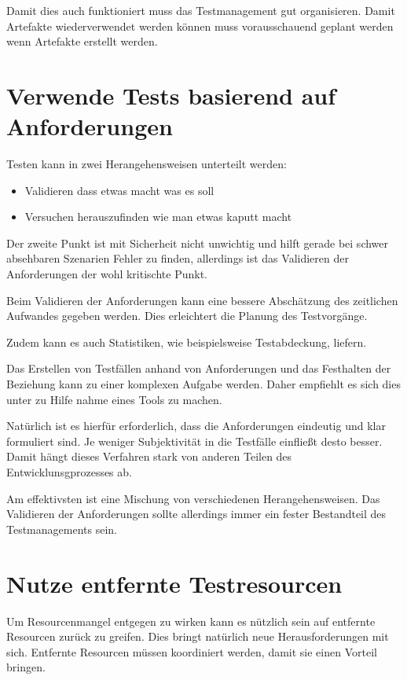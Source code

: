 Damit dies auch funktioniert muss das Testmanagement gut organisieren. Damit Artefakte wiederverwendet werden k\"onnen muss vorausschauend geplant werden wenn Artefakte erstellt werden.

\section{Verwende Tests basierend auf Anforderungen}
Testen kann in zwei Herangehensweisen unterteilt werden:
\begin{itemize}
	\item Validieren dass etwas macht was es soll
	\item Versuchen herauszufinden wie man etwas kaputt macht
\end{itemize}

Der zweite Punkt ist mit Sicherheit nicht unwichtig und hilft gerade bei schwer absehbaren Szenarien Fehler zu finden, allerdings ist das Validieren der Anforderungen der wohl kritischte Punkt.

Beim Validieren der Anforderungen kann eine bessere Absch\"atzung des zeitlichen Aufwandes gegeben werden. Dies erleichtert die Planung des Testvorg\"ange.

Zudem kann es auch Statistiken, wie beispielsweise Testabdeckung, liefern.

Das Erstellen von Testf\"allen anhand von Anforderungen und das Festhalten der Beziehung kann zu einer komplexen Aufgabe werden. Daher empfiehlt es sich dies unter zu Hilfe nahme eines Tools zu machen.

Nat\"urlich ist es hierf\"ur erforderlich, dass die Anforderungen eindeutig und klar formuliert sind. Je weniger Subjektivit\"at in die Testf\"alle einflie\ss{}t desto besser. Damit h\"angt dieses Verfahren stark von anderen Teilen des Entwicklunsgprozesses ab.

Am effektivsten ist eine Mischung von verschiedenen Herangehensweisen. Das Validieren der Anforderungen sollte allerdings immer ein fester Bestandteil des Testmanagements sein.

\section{Nutze entfernte Testresourcen}
Um Resourcenmangel entgegen zu wirken kann es n\"utzlich sein auf entfernte Resourcen zur\"uck zu greifen. Dies bringt nat\"urlich neue Herausforderungen mit sich. Entfernte Resourcen m\"ussen koordiniert werden, damit sie einen Vorteil bringen.

